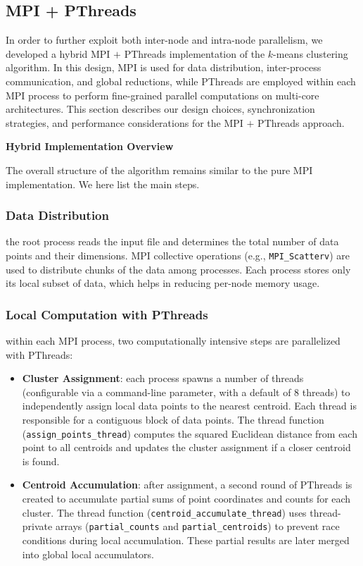 \documentclass[11pt, journal]{IEEEtran}
\newcommand{\nwl}{

\vspace{11pt}

}
\begin{document}
\subsection{MPI + PThreads}

In order to further exploit both inter-node and intra-node parallelism, we developed a hybrid MPI $+$ PThreads implementation of the $k$-means clustering algorithm. In this design, MPI is used for data distribution, inter-process communication, and global reductions, while PThreads are employed within each MPI process to perform fine-grained parallel computations on multi-core architectures. This section describes our design choices, synchronization strategies, and performance considerations for the MPI $+$ PThreads approach.
\nwl
\noindent \textbf{Hybrid Implementation Overview}

The overall structure of the algorithm remains similar to the pure MPI implementation. We here list the main steps.

\subsubsection{Data Distribution} the root process reads the input file and determines the total number of data points and their dimensions. MPI collective operations (e.g., \texttt{MPI\_Scatterv}) are used to distribute chunks of the data among processes. Each process stores only its local subset of data, which helps in reducing per-node memory usage.
\nwl
\subsubsection{Local Computation with PThreads} within each MPI process, two computationally intensive steps are parallelized with PThreads:
\begin{itemize}
    \item \textbf{Cluster Assignment}: each process spawns a number of threads (configurable via a command-line parameter, with a default of 8 threads) to independently assign local data points to the nearest centroid. Each thread is responsible for a contiguous block of data points. The thread function (\texttt{assign\_points\_thread}) computes the squared Euclidean distance from each point to all centroids and updates the cluster assignment if a closer centroid is found.
    \item \textbf{Centroid Accumulation}: after assignment, a second round of PThreads is created to accumulate partial sums of point coordinates and counts for each cluster. The thread function (\texttt{centroid\_accumulate\_thread}) uses thread-private arrays (\texttt{partial\_counts} and \texttt{partial\_centroids}) to prevent race conditions during local accumulation. These partial results are later merged into global local accumulators.
\end{itemize}
\nwl
\end{document}
